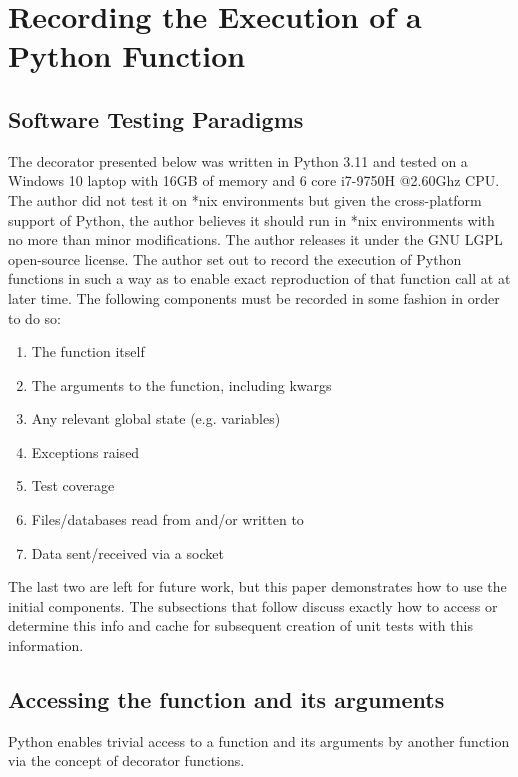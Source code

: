 \section{Recording the Execution of a Python Function}\label{sec:approach}

\subsection{Software Testing Paradigms}\label{sec:intro-1}

The decorator presented below was written in Python 3.11 and tested on a 
Windows 10 laptop with 16GB of memory and 6 core i7-9750H @2.60Ghz CPU.
The author did not test it on *nix environments but given the
cross-platform support of Python, the author believes it should run in *nix 
environments with no more than minor modifications. The author releases it
 under the GNU LGPL open-source license.
The author set out to record the execution of Python functions
in such a way as to enable exact reproduction of that 
function call at at later time.  The following components
must be recorded in some fashion in order to do so:
\begin{enumerate}
  \item The function itself
  \item The arguments to the function, including kwargs
  \item Any relevant global state (e.g. variables)
  \item Exceptions raised
  \item Test coverage
  \item Files/databases read from and/or written to
  \item Data sent/received via a socket
\end{enumerate}

The last two are left for future work, but this paper demonstrates how to use 
the initial components. The subsections that follow discuss exactly how to 
access or determine this info and cache for subsequent creation of unit tests
with this information.
\subsection{Accessing the function and its arguments}\label{sec:approach-internal-1}

Python enables trivial access to a function and 
its arguments by another function via the concept of 
decorator functions.

